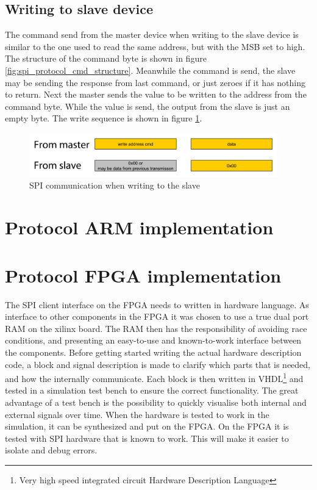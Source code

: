 \subsection{Writing to slave device}
The command send from the master device when writing to the slave device is similar to the one used to read the same address, but with the MSB set to high. The structure of the command byte is shown in figure \ref{fig:spi_protocol_cmd_structure}. Meanwhile the command is send, the slave may be sending the response from last command, or just zeroes if it has nothing to return. Next the master sends the value to be written to the address from the command byte. While the value is send, the output from the slave is just an empty byte. The write sequence is shown in figure \ref{fig:spi_protocol_command_structure_write}.

\begin{figure}[htb]
	\centering
	\includegraphics[width=0.96\textwidth]{graphics/spi_protocol_command_structure_write_wlabels.pdf} %
	\caption{SPI communication when writing to the slave}
	\label{fig:spi_protocol_command_structure_write}			%
\end{figure}



\section{Protocol ARM implementation}


\section{Protocol FPGA implementation}
The SPI client interface on the FPGA needs to written in hardware language. As interface to other components in the FPGA it was chosen to use a true dual port RAM on the xilinx board. The RAM then has the responsibility of avoiding race conditions, and presenting an easy-to-use and known-to-work interface between the components. 
Before getting started writing the actual hardware description code, a block and signal description is made to clarify which parts that is needed, and how the internally communicate. Each block is then written in VHDL\footnote{Very high speed integrated circuit Hardware Description Language} and tested in a simulation test bench to ensure the correct functionality. The great advantage of a test bench is the possibility to quickly visualise both internal and external signals over time. When the hardware is tested to work in the simulation, it can be synthesized and put on the FPGA. On the FPGA it is tested with SPI hardware that is known to work. This will make it easier to isolate and debug errors.

